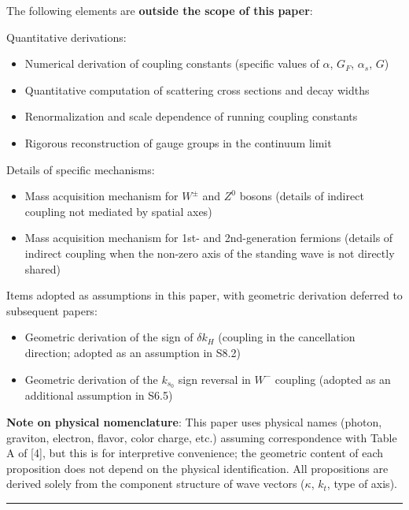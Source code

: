 \documentclass[
  a4paper,11pt]{article}
\providecommand{\tightlist}{%
  \setlength{\itemsep}{0pt}\setlength{\parskip}{0pt}}
\theoremstyle{definition}
\theoremstyle{remark}
\begin{document}
The following elements are \textbf{outside the scope of this paper}:

Quantitative derivations:

\begin{itemize}
\tightlist
\item
  Numerical derivation of coupling constants (specific values of
  \(\alpha\), \(G_F\), \(\alpha_s\), \(G\))
\item
  Quantitative computation of scattering cross sections and decay widths
\item
  Renormalization and scale dependence of running coupling constants
\item
  Rigorous reconstruction of gauge groups in the continuum limit
\end{itemize}

Details of specific mechanisms:

\begin{itemize}
\tightlist
\item
  Mass acquisition mechanism for \(W^{\pm}\) and \(Z^0\) bosons (details
  of indirect coupling not mediated by spatial axes)
\item
  Mass acquisition mechanism for 1st- and 2nd-generation fermions
  (details of indirect coupling when the non-zero axis of the standing
  wave is not directly shared)
\end{itemize}

Items adopted as assumptions in this paper, with geometric derivation
deferred to subsequent papers:

\begin{itemize}
\tightlist
\item
  Geometric derivation of the sign of \(\delta k_H\) (coupling in the
  cancellation direction; adopted as an assumption in S8.2)
\item
  Geometric derivation of the \(k_{s_0}\) sign reversal in \(W^-\)
  coupling (adopted as an additional assumption in S6.5)
\end{itemize}

\textbf{Note on physical nomenclature}: This paper uses physical names
(photon, graviton, electron, flavor, color charge, etc.) assuming
correspondence with Table A of {[}4{]}, but this is for interpretive
convenience; the geometric content of each proposition does not depend
on the physical identification. All propositions are derived solely from
the component structure of wave vectors (\(\kappa\), \(k_t\), type of
axis).

\begin{center}\rule{0.5\linewidth}{0.5pt}\end{center}
\end{document}

